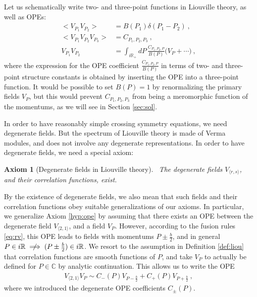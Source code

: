 \documentclass[12pt, a4paper]{article}
\theoremstyle{break}
\newtheorem{hyp}[exo]{Axiom}
\begin{document}
Let us schematically write two- and three-point functions in Liouville theory, as well as OPEs:
\begin{align}
 \Big< V_{P_1}V_{P_2} \Big>  &=  B(P_1)\delta(P_1-P_2)\ ,
 \label{eq:vv}
 \\
 \Big< V_{P_1}V_{P_2}V_{P_3} \Big> & = C_{P_1,P_2,P_3} \ ,
 \label{eq:vvv}
 \\
 V_{P_1}V_{P_2} &= \int_{i\mathbb{R}_+} dP\, \frac{C_{P_1,P_2,P}}{B(P)} \Big( V_P + \cdots\Big)\ ,
 \label{eq:v1v2}
\end{align}
where the expression for the OPE coefficient $\frac{C_{P_1,P_2,P}}{B(P)}$ in terms of two- and three-point structure constants is obtained by inserting the OPE into a three-point function. It would be possible to set $B(P)=1$ by renormalizing the primary fields $V_{P}$, but this would prevent $C_{P_1,P_2,P_3}$ from being a meromorphic function of the momentums, as we will see in Section \ref{sec:sol}.

In order to have reasonably simple crossing symmetry equations, we need degenerate fields. 
But the spectrum of Liouville theory is made of Verma modules, and does not involve any degenerate representations.
In order to have degenerate fields, we need a special axiom:

\begin{hyp}[Degenerate fields in Liouville theory]
 ~\label{hyp:degl}
 The degenerate fields $V_{\langle r, s\rangle}$, and their correlation functions, exist. 
\end{hyp}
By the existence of degenerate fields, we also mean that such fields and their correlation functions obey suitable generalizations of our axioms. 
In particular, we generalize Axiom \ref{hyp:ope} by assuming that there exists an OPE between the degenerate field $V_{\langle 2, 1\rangle}$, and a field $V_P$. 
However, according to the fusion rules \eqref{eq:rv}, this OPE leads to fields with momentums $P\pm \frac{b}{2}$, and in general
$P \in i\mathbb{R} \centernot\implies (P\pm\frac{b}{2}) \in i\mathbb{R}$.
We resort to the assumption in Definition \ref{def:liou} that correlation functions are smooth functions of $P$, and take $V_P$ to actually be defined for $P\in\mathbb{C}$ by analytic continuation. This allows us to write the OPE
\begin{align}
 V_{\langle 2, 1\rangle} V_P \sim C_-(P) V_{P-\frac{b}{2}} + C_+(P)V_{P +\frac{b}{2}}\ ,
 \label{degope}
\end{align}
where we introduced the degenerate OPE coefficients $C_\pm(P)$.
\end{document}
